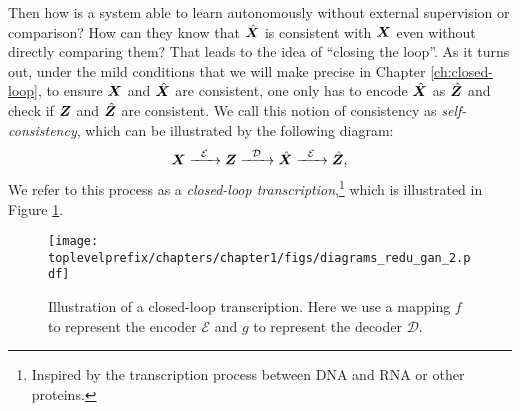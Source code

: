 \documentclass[../../book-main.tex]{subfiles}
\begin{document}
Then how is a system able to learn autonomously without external supervision or comparison? How can they know that $\hat {\bm{X}}$ is consistent with $\bm{X}$ even without directly comparing them? That leads to the idea of ``closing the loop''. As it turns out, under the mild conditions that we will make precise in Chapter \ref{ch:closed-loop}, to ensure $\bm{X}$ and $\hat {\bm{X}}$ are consistent, one only has to encode $\hat {\bm{X}}$ as $\hat {\bm{Z}}$ and check if $\bm{Z}$ and $\hat {\bm{Z}}$ are consistent. We call this notion of consistency as {\em self-consistency}, which  can be illustrated by the following diagram:
\begin{equation}
    \bm{X}   \xrightarrow{\hspace{2mm} \mathcal{E}\hspace{2mm}} \bm{Z}  \xrightarrow{\hspace{2mm} \mathcal{D} \hspace{2mm}} \hat {\bm{X}} \xrightarrow{\hspace{2mm} \mathcal{E}\hspace{2mm}} \hat {\bm{Z}},
    \label{eqn:closed-loop}
\end{equation}
We refer to this process as a {\em closed-loop transcription},\footnote{Inspired by the transcription process between DNA and RNA or other proteins.} which is illustrated in Figure \ref{fig:closed-loop}.

\begin{figure}[t]
    \centering
\texttt{[image: \\toplevelprefix/chapters/chapter1/figs/diagrams\_redu\_gan\_2.pdf]}
\caption{Illustration of a closed-loop transcription. Here we use a mapping $f$ to represent the encoder $\mathcal{E}$ and $g$ to represent the decoder $\mathcal{D}$.}  \label{fig:closed-loop}
\end{figure}
\end{document}
